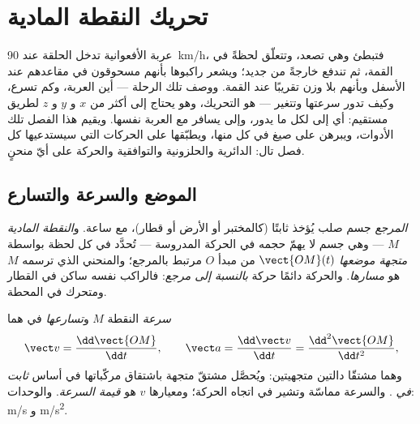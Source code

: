 \chapter{تحريك النقطة المادية}\label{ch:b1:point-kinematics}

عربة الأفعوانية تدخل الحلقة عند \qty{90}{km/h}، فتبطئ
وهي تصعد، وتتعلّق لحظةً في القمة، ثم تندفع خارجةً من جديد؛
ويشعر راكبوها بأنهم مسحوقون في مقاعدهم عند الأسفل وبأنهم بلا وزن
تقريبًا عند القمة. ووصف تلك الرحلة --- أين العربة، وكم
تسرع، وكيف تدور سرعتها وتتغير --- هو التحريك،
وهو يحتاج إلى أكثر من $x$ و $y$ و $z$ لطريق مستقيم: أي إلى  لكل ما يدور، وإلى  يسافر مع العربة
نفسها. ويقيم هذا الفصل تلك الأدوات، ويبرهن على صيغ
  في كل منها، ويطبّقها على
الحركات التي سيستدعيها كل فصل تال: الدائرية والحلزونية
والتوافقية والحركة على أيّ منحنٍ.

\section{الموضع والسرعة والتسارع}

\begin{definition}\label{def:b1:point-kinematics:frame}
\emph{المرجع} جسم صلب يُؤخذ ثابتًا (كالمختبر
أو الأرض أو قطار)، مع ساعة. و\emph{النقطة
المادية} $M$ --- وهي جسم لا يهمّ حجمه في الحركة المدروسة
--- تُحدَّد في كل لحظة بواسطة \emph{متجهة موضعها}
$\vect{OM}(t)$ من مبدأ $O$ مرتبط بالمرجع؛ والمنحني
الذي ترسمه $M$ هو \emph{مسارها}. والحركة دائمًا حركة
\emph{بالنسبة إلى مرجع}: فالراكب نفسه ساكن في القطار
ومتحرك في المحطة.
\end{definition}

\begin{definition}\label{def:b1:point-kinematics:velocity}
\emph{سرعة} النقطة $M$ و\emph{تسارعها} في  هما
\[
\vect v = \frac{\dd\vect{OM}}{\dd t}, \qquad
\vect a = \frac{\dd\vect v}{\dd t} = \frac{\dd^2\vect{OM}}{\dd t^2},
\]
وهما مشتقّا دالتين متجهيتين: ويُحصَّل مشتقّ متجهة
باشتقاق مركّباتها في أساس \emph{ثابت في
}. والسرعة مماسّة 
وتشير في اتجاه الحركة؛ ومعيارها $v$ هو \emph{قيمة السرعة}. والوحدات:
\unit{m/s} و \unit{m/s^2}.
\end{definition}

